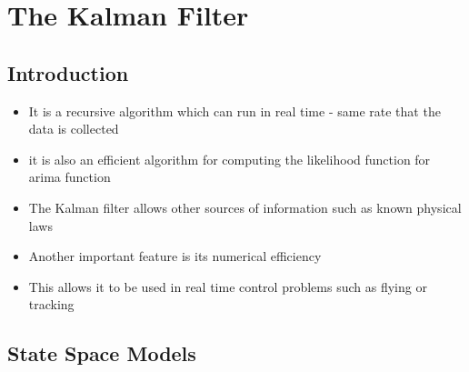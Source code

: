 \documentclass[11pt]{article}
\begin{document}
\newpage 
\section{The Kalman Filter}
\subsection{Introduction}
\begin{itemize}
    \item It is a recursive algorithm which can run in real time - same rate that the data is collected
    \item it is also an efficient algorithm for computing the likelihood function for arima function 
    \item The Kalman filter allows other sources of information such as known physical laws
    \item Another important feature is its numerical efficiency
    \item This allows it to be used in real time control problems such as flying or tracking
\end{itemize}
\subsection{State Space Models}
\end{document}
